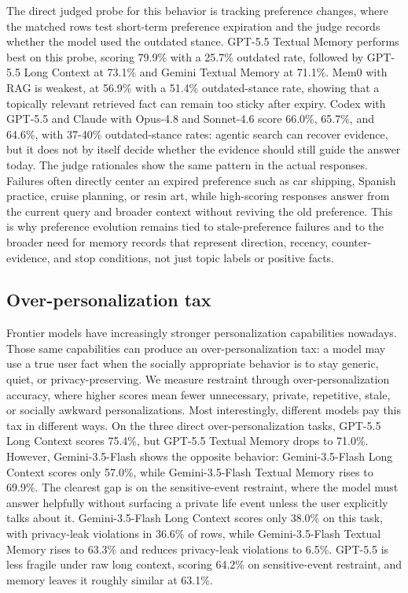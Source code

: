 \documentclass[]{fairmeta}
\begin{document}
The direct judged probe for this behavior is tracking preference changes, where the matched rows test short-term preference expiration and the judge records whether the model used the outdated stance. GPT-5.5 Textual Memory performs best on this probe, scoring 79.9\% with a 25.7\% outdated rate, followed by GPT-5.5 Long Context at 73.1\% and Gemini Textual Memory at 71.1\%. Mem0 with RAG is weakest, at 56.9\% with a 51.4\% outdated-stance rate, showing that a topically relevant retrieved fact can remain too sticky after expiry. Codex with GPT-5.5 and Claude with Opus-4.8 and Sonnet-4.6 score 66.0\%, 65.7\%, and 64.6\%, with 37-40\% outdated-stance rates: agentic search can recover evidence, but it does not by itself decide whether the evidence should still guide the answer today. The judge rationales show the same pattern in the actual responses. Failures often directly center an expired preference such as car shipping, Spanish practice, cruise planning, or resin art, while high-scoring responses answer from the current query and broader context without reviving the old preference. This is why preference evolution remains tied to stale-preference failures and to the broader need for memory records that represent direction, recency, counter-evidence, and stop conditions, not just topic labels or positive facts.


\subsection{Over-personalization tax}

Frontier models have increasingly stronger personalization capabilities nowadays. Those same capabilities can produce an over-personalization tax: a model may use a true user fact when the socially appropriate behavior is to stay generic, quiet, or privacy-preserving. We measure restraint through over-personalization accuracy, where higher scores mean fewer unnecessary, private, repetitive, stale, or socially awkward personalizations. Most interestingly, different models pay this tax in different ways. On the three direct over-personalization tasks, GPT-5.5 Long Context scores 75.4\%, but GPT-5.5 Textual Memory drops to 71.0\%. However, Gemini-3.5-Flash shows the opposite behavior: Gemini-3.5-Flash Long Context scores only 57.0\%, while Gemini-3.5-Flash Textual Memory rises to 69.9\%. The clearest gap is on the sensitive-event restraint, where the model must answer helpfully without surfacing a private life event unless the user explicitly talks about it. Gemini-3.5-Flash Long Context scores only 38.0\% on this task, with privacy-leak violations in 36.6\% of rows, while Gemini-3.5-Flash Textual Memory rises to 63.3\% and reduces privacy-leak violations to 6.5\%. GPT-5.5 is less fragile under raw long context, scoring 64.2\% on sensitive-event restraint, and memory leaves it roughly similar at 63.1\%.
\end{document}
